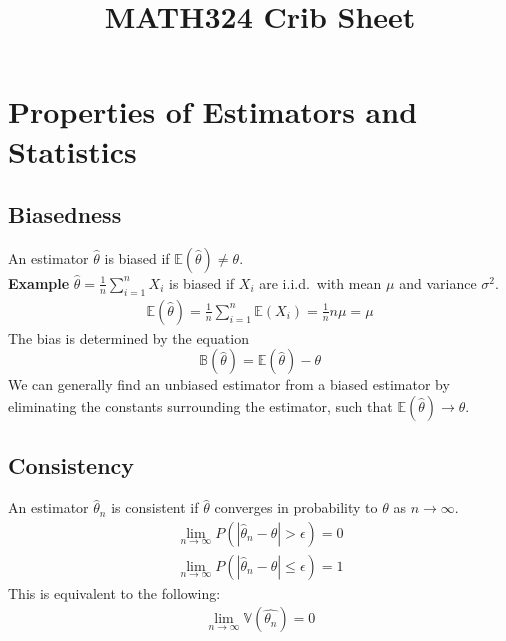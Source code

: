 \documentclass[sn-mathphys,Numbered]{sn-jnl}%
\newcommand{\Var}{\mathbb{V}}
\newcommand{\E}{\mathbb{E}}
\newcommand{\Bias}{\mathbb{B}}
\newcommand{\Example}{\textbf{Example }}
\begin{document}
\title[MATH324]{MATH324 Crib Sheet}

\author{ }

\maketitle
\newpage

\section{Properties of Estimators and Statistics}
\subsection{Biasedness}\label{biasedness}
An estimator $\hat{\theta}$ is biased if $\E(\hat{\theta}) \neq \theta$.\\
\Example $\hat{\theta} = \frac{1}{n} \sum_{i=1}^n X_i$ is biased if $X_i$ are
i.i.d.\ with mean $\mu$ and variance $\sigma^2$.
\begin{align}
    \E ( \hat{\theta} ) = \frac{1}{n} \sum_{i=1}^n \E (X_i
    ) = \frac{1}{n} n \mu = \mu
\end{align}
The bias is determined by the equation
\begin{equation}
    \Bias ( \hat{\theta} ) = \E ( \hat{\theta} ) - \theta
\end{equation}
We can generally find an unbiased estimator from a biased estimator by eliminating
the constants surrounding the estimator, such that $\E(\hat{\theta}) \to \theta$.

\subsection{Consistency}\label{consistency}
An estimator $\hat{\theta}_n$ is consistent if $\hat{\theta}$ converges in
probability to $\theta$ as $n \rightarrow \infty$.
\begin{align}
    \lim_{n \rightarrow \infty} P(|\hat{\theta}_n - \theta| > \epsilon) = 0 \\
    \lim_{n \rightarrow \infty} P(|\hat{\theta}_n - \theta| \leq \epsilon) = 1
\end{align}
This is equivalent to the following:
\begin{align}
    \lim_{n \to \infty} \Var ( \hat{\theta_n} ) = 0
\end{align}
\end{document}
